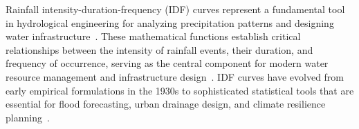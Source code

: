 Rainfall intensity-duration-frequency (IDF) curves represent a fundamental tool in hydrological engineering for analyzing precipitation patterns and designing water infrastructure~\cite{1, 2}. 
These mathematical functions establish critical relationships between the intensity of rainfall events, their duration, and frequency of occurrence, serving as the central component for modern water resource management and infrastructure design~\cite{3}.
IDF curves have evolved from early empirical formulations in the 1930s to sophisticated statistical tools that are essential for flood forecasting, urban drainage design, and climate resilience planning~\cite{2, 4}.